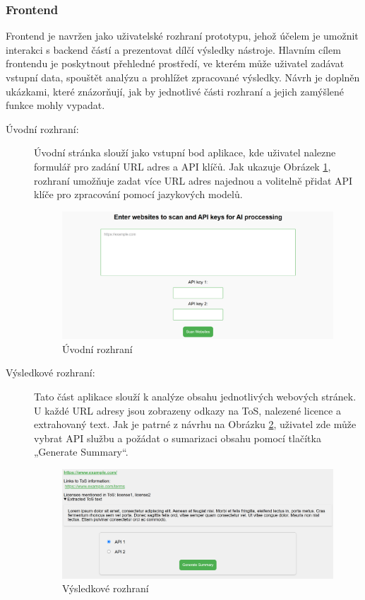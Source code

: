 \clearpage
\subsubsection{Frontend}

Frontend je navržen jako uživatelské rozhraní prototypu, jehož účelem je umožnit interakci s backend částí a prezentovat dílčí výsledky nástroje.
Hlavním cílem frontendu je poskytnout přehledné prostředí, ve kterém může uživatel zadávat vstupní data, spouštět analýzu a prohlížet zpracované výsledky.
Návrh je doplněn ukázkami, které znázorňují, jak by jednotlivé části rozhraní a jejich zamýšlené funkce mohly vypadat.

\begin{description}
    \item[Úvodní rozhraní:] Úvodní stránka slouží jako vstupní bod aplikace, kde uživatel nalezne formulář pro zadání URL adres a API klíčů. Jak ukazuje Obrázek \ref{fig:index.png}, rozhraní umožňuje zadat více URL adres najednou a volitelně přidat API klíče pro zpracování pomocí jazykových modelů.  
    \begin{figure}[!htbp]
        \centering
        \includegraphics[width=\linewidth]{images/index.png}
        \caption{Úvodní rozhraní}
        \label{fig:index.png}
    \end{figure}

    \clearpage
    \item[Výsledkové rozhraní:] Tato část aplikace slouží k analýze obsahu jednotlivých webových stránek. U každé URL adresy jsou zobrazeny odkazy na ToS, nalezené licence a extrahovaný text. Jak je patrné z návrhu na Obrázku \ref{fig:scans.png}, uživatel zde může vybrat API službu a požádat o sumarizaci obsahu pomocí tlačítka „Generate Summary“.  
    \begin{figure}[H]
        \centering
        \includegraphics[width=\linewidth]{images/scans.png}
        \caption{Výsledkové rozhraní}
        \label{fig:scans.png}
    \end{figure}


\end{description}
